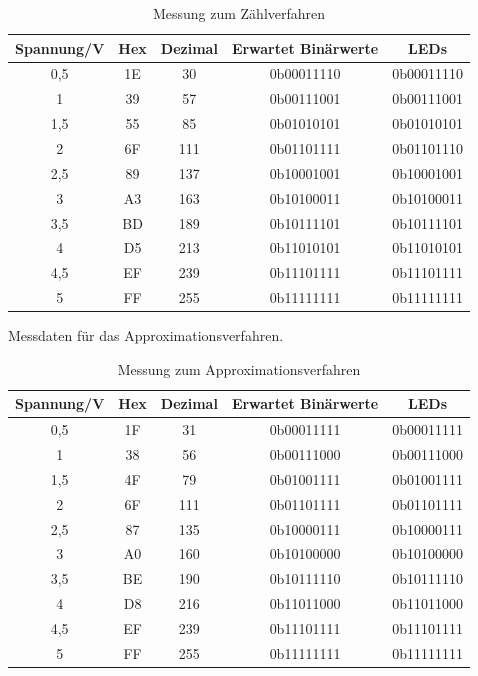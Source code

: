 \documentclass[12pt,a4paper]{article}
\begin{document}
\begin{table}[htbp]
\begin{center}
\begin{tabular}{|c|c|c|c|c|}
\hline
\multicolumn{1}{|l|}{Spannung/V} & Hex & \multicolumn{1}{l|}{Dezimal} & \multicolumn{1}{l|}{Erwartet Binärwerte} & LEDs \\ \hline
0,5 & 1E & 30 & 0b00011110 & 0b00011110 \\ \hline
1 & 39 & 57 & 0b00111001 & 0b00111001 \\ \hline
1,5 & 55 & 85 & 0b01010101 & 0b01010101 \\ \hline
2 & 6F & 111 & 0b01101111 & 0b01101110 \\ \hline
2,5 & 89 & 137 & 0b10001001 & 0b10001001 \\ \hline
3 & A3 & 163 & 0b10100011 & 0b10100011 \\ \hline
3,5 & BD & 189 & 0b10111101 & 0b10111101 \\ \hline
4 & D5 & 213 & 0b11010101 & 0b11010101 \\ \hline
4,5 & EF & 239 & 0b11101111 & 0b11101111 \\ \hline
5 & FF & 255 & 0b11111111 & 0b11111111 \\ \hline
\end{tabular}
\end{center}
\caption{Messung zum Zählverfahren}
\label{tab:zaehl}
\end{table}

Messdaten für das Approximationsverfahren.

\begin{table}[htbp]
\begin{center}
\begin{tabular}{|c|c|c|c|c|}
\hline
\multicolumn{1}{|l|}{Spannung/V} & Hex & \multicolumn{1}{l|}{Dezimal} & \multicolumn{1}{l|}{Erwartet Binärwerte} & LEDs \\ \hline
0,5 & 1F & 31 & 0b00011111 & 0b00011111 \\ \hline
1 & 38 & 56 & 0b00111000 & 0b00111000 \\ \hline
1,5 & 4F & 79 & 0b01001111 & 0b01001111 \\ \hline
2 & 6F & 111 & 0b01101111 & 0b01101111 \\ \hline
2,5 & 87 & 135 & 0b10000111 & 0b10000111 \\ \hline
3 & A0 & 160 & 0b10100000 & 0b10100000 \\ \hline
3,5 & BE & 190 & 0b10111110 & 0b10111110 \\ \hline
4 & D8 & 216 & 0b11011000 & 0b11011000 \\ \hline
4,5 & EF & 239 & 0b11101111 & 0b11101111 \\ \hline
5 & FF & 255 & 0b11111111 & 0b11111111 \\ \hline
\end{tabular}
\end{center}
\caption{Messung zum Approximationsverfahren}
\label{tab:approx}
\end{table}
\end{document}
